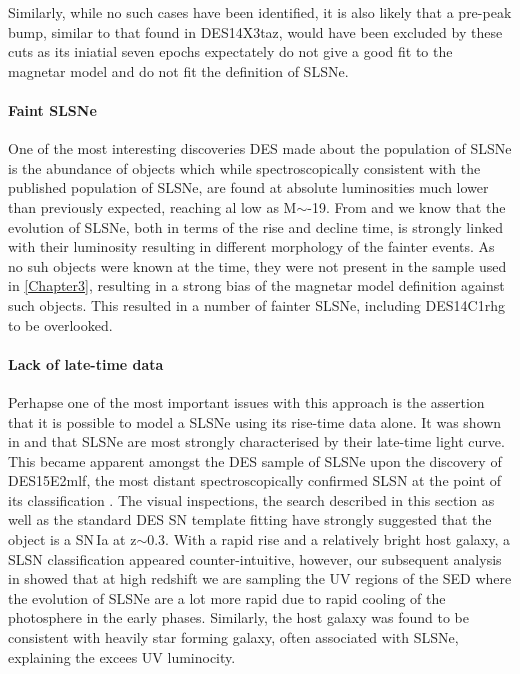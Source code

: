 Similarly, while no such cases have been identified, it is also likely that a pre-peak bump, similar to that found in DES14X3taz, would have been excluded by these cuts as its iniatial seven epochs expectately do not give a good fit to the magnetar model and do not fit the definition of SLSNe.

\paragraph{Faint SLSNe}
One of the most interesting discoveries DES made about the population of SLSNe is the abundance of objects which while spectroscopically consistent with the published population of SLSNe, are found at absolute luminosities much lower than previously expected, reaching al low as M$\sim$-19. From \citet{Inserra2018a} and \citet{Nicholl2014, Nicholl2017} we know that the evolution of SLSNe, both in terms of the rise and decline time, is strongly linked with their luminosity resulting in different morphology of the fainter events. As no suh objects were known at the time, they were not present in the sample used in \cref{Chapter3}, resulting in a strong bias of the magnetar model definition against such objects. This resulted in a number of fainter SLSNe, including DES14C1rhg to be overlooked.

\paragraph{Lack of late-time data}
Perhapse one of the most important issues with this approach is the assertion that it is possible to model a SLSNe using its rise-time data alone. It was shown in \citet{Inserra2013} and \citet{Inserra2018a} that SLSNe are most strongly characterised by their late-time light curve. This became apparent amongst the DES sample of SLSNe upon the discovery of DES15E2mlf, the most distant spectroscopically confirmed SLSN at the point of its classification \citep{Pan2017}. The visual inspections, the search described in this section as well as the standard DES SN template fitting have strongly suggested that the object is a SN\,Ia at z$\sim$0.3. With a rapid rise and a relatively bright host galaxy, a SLSN classification appeared counter-intuitive, however, our subsequent analysis in \citet{Pan2017} showed that at high redshift we are sampling the UV regions of the SED where the evolution of SLSNe are a lot more rapid due to rapid cooling of the photosphere in the early phases. Similarly, the host galaxy was found to be consistent with heavily star forming galaxy, often associated with SLSNe, explaining the excees UV luminocity.

